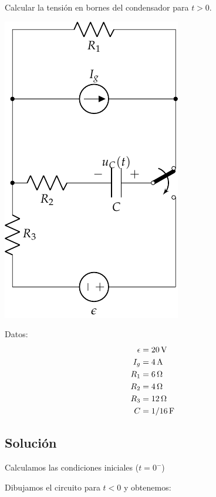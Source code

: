Calcular la tensión en bornes del condensador para $t > 0$.

\begin{minipage}{0.5\textwidth}
  \includegraphics[scale=0.85]{figuras/FM_4_3}
\end{minipage}
\hfill
\begin{minipage}{0.5\textwidth}
  Datos:
  \begin{align*}
    \epsilon &= \SI{20}{\volt}\\
    I_g &= \SI{4}{\ampere}\\
    R_1 &= \SI{6}{\ohm}\\
    R_2 &= \SI{4}{\ohm}\\
    R_3 &= \SI{12}{\ohm}\\
    C &= \SI[parse-numbers=false]{1/16}{\farad}      
  \end{align*}

\end{minipage}

\subsection*{Solución}

Calculamos las condiciones iniciales ($t = 0^-$)

Dibujamos el circuito para $t < 0$ y obtenemos:

